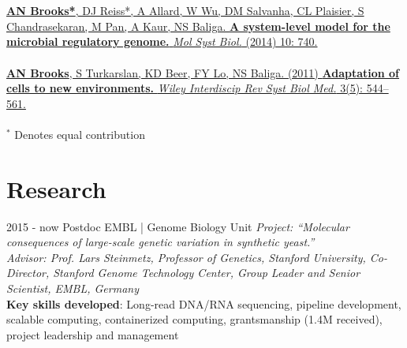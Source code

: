 \documentclass[usenames,dvipsnames]{friggeri-cv}
\begin{document}
\\
\\
\href{http://msb.embopress.org/cgi/pmidlookup?view=long&pmid=25028489}{\noindent
\textbf{AN Brooks*}, DJ Reiss*, A Allard, W Wu, DM Salvanha, CL Plaisier, S Chandrasekaran, M Pan, A Kaur, NS Baliga.
\textbf{A system-level model for the microbial regulatory genome.}
\emph{Mol Syst Biol.} (2014) 10: 740.
}
\\
\\
\href{http://www.ncbi.nlm.nih.gov/pubmed/21197660}{\noindent
\textbf{AN Brooks}, S Turkarslan, KD Beer, FY Lo, NS Baliga. (2011)
\textbf{Adaptation of cells to new environments.}
\emph{Wiley Interdiscip Rev Syst Biol Med.} 3(5): 544–561.
}
\\
\\
$^{\ast}$ Denotes equal contribution

\section{Research}
\begin{entrylist}
  \entry
    {2015 - now}
    {Postdoc}
    {EMBL | Genome Biology Unit}
    {\emph{Project: ``Molecular consequences of large-scale genetic variation in synthetic yeast.''}\\
    \emph{Advisor: Prof. Lars Steinmetz, Professor of Genetics, Stanford University, Co-Director, Stanford Genome Technology Center, Group Leader and Senior Scientist, EMBL, Germany}\\
    \textbf{Key skills developed}: Long-read DNA/RNA sequencing, pipeline development, scalable computing, containerized computing, grantsmanship (1.4M received), project leadership and management}
\end{entrylist}
\end{document}
